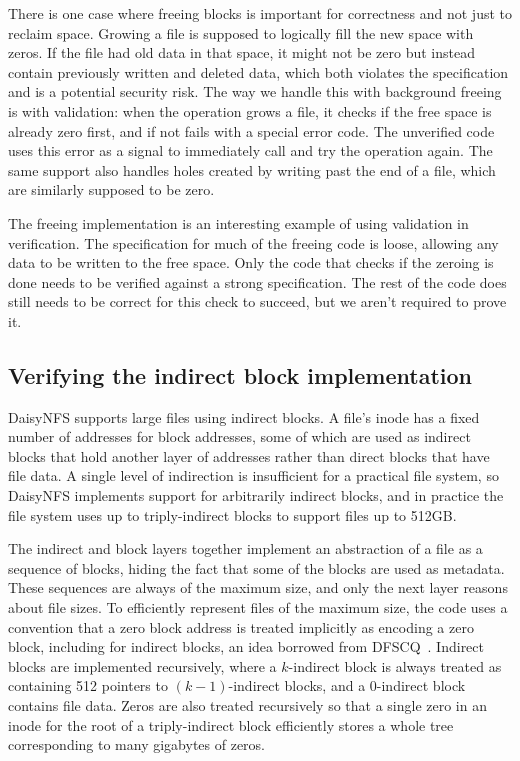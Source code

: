 There is one case where freeing blocks is important for correctness and not just
to reclaim space. Growing a file is supposed to logically fill the new space
with zeros. If the file had old data in that space, it might not be zero but
instead contain previously written and deleted data, which both violates the specification and
is a potential security risk. The way we handle this with background freeing is
with validation: when the  operation grows a file, it checks if the
free space is already zero first, and if not fails with a special error code. The
unverified code uses this error as a signal to immediately call
 and try the operation again. The same support also handles
holes created by writing past the end of a file, which are similarly supposed to
be zero.

The freeing implementation is an interesting example of using validation in
verification. The specification for much of the freeing code is loose, allowing
any data to be written to the free space. Only the code that checks if the
zeroing is done needs to be verified against a strong specification. The rest of
the code does still needs to be correct for this check to succeed, but we
aren't required to prove it.

\subsection{Verifying the indirect block implementation}%
\label{sec:dafny:indirect}

DaisyNFS supports large files using indirect blocks. A file's inode has a fixed
number of addresses for block addresses, some of which are used as indirect
blocks that hold another layer of addresses rather than direct blocks that have
file data. A single level of indirection is insufficient for a practical file
system, so DaisyNFS implements support for arbitrarily indirect blocks, and in
practice the file system uses up to triply-indirect blocks to support files up
to 512GB.\@

The indirect and block layers together implement an abstraction of a file as a
sequence of blocks, hiding the fact that some of the blocks are used as
metadata. These sequences are always of the maximum size, and only the next
layer reasons about file sizes. To efficiently represent files of the maximum
size, the code uses a convention that a zero block address is treated implicitly
as encoding a zero block, including for indirect blocks, an idea borrowed from
DFSCQ~\cite{akonradi-meng}. Indirect blocks are implemented recursively, where a
$k$-indirect block is always treated as containing 512 pointers to
$(k-1)$-indirect blocks, and a 0-indirect block contains file data. Zeros are
also treated recursively so that a single zero in an inode for the root of a
triply-indirect block efficiently stores a whole tree corresponding to many
gigabytes of zeros.

